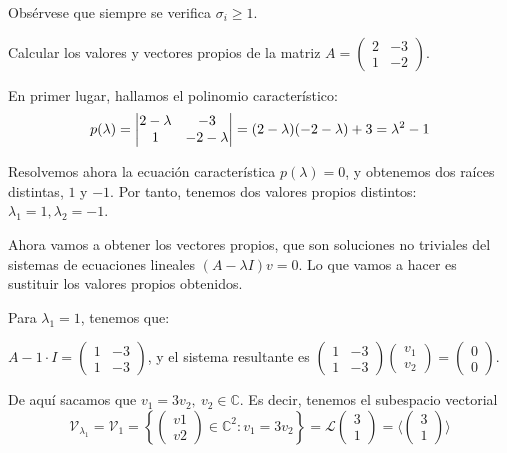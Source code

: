 \begin{nota}
	Obsérvese que siempre se verifica $\sigma_i \ge 1$.
\end{nota}


  \begin{ejemplo} \label{ej2} Calcular los valores y vectores propios de la matriz
    $A =
    \begin{pmatrix}
      2 & -3 \\
      1 & -2
    \end{pmatrix}
    $.

    En primer lugar, hallamos el polinomio característico:
    $$ p(\lambda) = \begin{vmatrix} 2-\lambda & -3 \\ 1 & -2-\lambda\end{vmatrix}
    = (2 - \lambda)(-2-\lambda) + 3 = \lambda^2-1$$

    Resolvemos ahora la ecuación característica $p(\lambda) = 0$, y obtenemos dos raíces
    distintas, $1$ y $-1$. Por tanto, tenemos dos valores propios distintos:
    $\lambda_1 = 1, \lambda_2 = -1$.

    Ahora vamos a obtener los vectores propios, que son soluciones no triviales
    del sistemas de ecuaciones lineales $(A - \lambda I)v = 0$. Lo que vamos a hacer es sustituir los valores propios obtenidos.

\begin{nlist}

    \item Para $\lambda_1 = 1$, tenemos que:

    $A - 1\cdot I =
    \begin{pmatrix}
      1 & -3 \\
      1 & -3
    \end{pmatrix}$, y el sistema resultante es $
    \begin{pmatrix}
      1 & -3 \\
      1 & -3
    \end{pmatrix}
    \begin{pmatrix}
      v_1 \\
      v_2
    \end{pmatrix} =
    \begin{pmatrix}
      0 \\
      0
    \end{pmatrix}$.

    De aquí sacamos que $v_1 = 3v_2,\ v_2 \in \mathbb C$. Es decir, tenemos el subespacio vectorial $$\mathcal V_{\lambda_1} = \mathcal V_1 = \left\{
    \begin{pmatrix}
      v1 \\
      v2
    \end{pmatrix} \in \mathbb C^2 : v_1 = 3v_2 \right\} = \mathscr L
    \begin{pmatrix}
      3 \\
      1
    \end{pmatrix} = \langle
    \begin{pmatrix}
      3 \\
      1
    \end{pmatrix} \rangle$$



\end{nlist}
\end{ejemplo}
